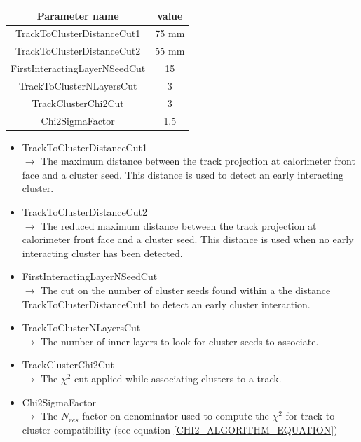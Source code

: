 \documentclass[cits]{JINST}
\begin{document}
\begin{table}[!ht]
  \begin{center}
    \begin{tabu} to \linewidth { c | c } 
          Parameter name & value \\
          \hline
          TrackToClusterDistanceCut1 & 75 mm \\
          TrackToClusterDistanceCut2 & 55 mm \\
          FirstInteractingLayerNSeedCut & 15 \\
          TrackToClusterNLayersCut & 3 \\
          TrackClusterChi2Cut & 3 \\
          Chi2SigmaFactor & 1.5
    \end{tabu} 
  \end{center}
\end{table}

\begin{itemize}
  \item TrackToClusterDistanceCut1 \\
  $\rightarrow$ The maximum distance between the track projection at calorimeter front face and a cluster seed. This distance is used to detect an early interacting cluster.
  \item TrackToClusterDistanceCut2 \\
  $\rightarrow$ The reduced maximum distance between the track projection at calorimeter front face and a cluster seed. This distance is used when no early interacting cluster has been detected.
  \item FirstInteractingLayerNSeedCut \\
  $\rightarrow$ The cut on the number of cluster seeds found within a the distance TrackToClusterDistanceCut1 to detect an early cluster interaction.
  \item TrackToClusterNLayersCut \\
  $\rightarrow$ The number of inner layers to look for cluster seeds to associate.
  \item TrackClusterChi2Cut \\
  $\rightarrow$ The $\chi^2$ cut applied while associating clusters to a track.
  \item Chi2SigmaFactor \\
  $\rightarrow$ The $N_{res}$ factor on denominator used to compute the $\chi^2$ for track-to-cluster compatibility (see equation \ref{CHI2_ALGORITHM_EQUATION})
\end{itemize}
\end{document}
